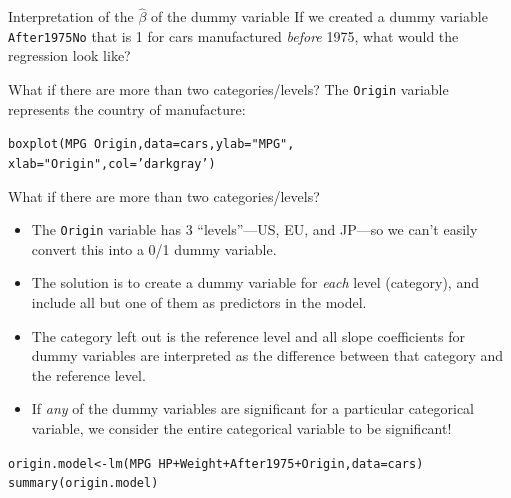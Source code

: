\documentclass{beamer}\usepackage[]{graphicx}\usepackage[]{color}
\makeatletter
\newcommand{\hlstr}[1]{\textcolor[rgb]{1,0.894,0.71}{#1}}%
\newcommand{\hlopt}[1]{\textcolor[rgb]{1,0.894,0.769}{#1}}%
\newcommand{\hlstd}[1]{\textcolor[rgb]{1,0.894,0.769}{#1}}%
\newcommand{\hlkwb}[1]{\textcolor[rgb]{0.804,0.776,0.451}{#1}}%
\newcommand{\hlkwc}[1]{\textcolor[rgb]{0.78,0.941,0.545}{#1}}%
\newcommand{\hlkwd}[1]{\textcolor[rgb]{1,0.78,0.769}{#1}}%
\newenvironment{kframe}{%
 \def\at@end@of@kframe{}%
 \ifinner\ifhmode%
  \def\at@end@of@kframe{\end{minipage}}%
  \begin{minipage}{\columnwidth}%
 \fi\fi%
 \def\FrameCommand##1{\hskip\@totalleftmargin \hskip-\fboxsep
 \colorbox{shadecolor}{##1}\hskip-\fboxsep
     \hskip-\linewidth \hskip-\@totalleftmargin \hskip\columnwidth}%
 \MakeFramed {\advance\hsize-\width
   \@totalleftmargin\z@ \linewidth\hsize
   \@setminipage}}%
 {\par\unskip\endMakeFramed%
 \at@end@of@kframe}
\newenvironment{knitrout}{}{} %
\makeatother
\begin{document}
\begin{darkframes}
\begin{frame}[fragile]{Interpretation of the $\hat\beta$ of the dummy variable}
      If we created a dummy variable \texttt{After1975No} that is 1 for cars manufactured \emph{before} 1975, what would the regression look like?
    \end{frame}

    \begin{frame}[fragile]{What if there are more than two categories/levels?}
      The \texttt{Origin} variable represents the country of manufacture:
\begin{knitrout}
\begin{kframe}
\begin{alltt}
\hlkwd{boxplot}\hlstd{(MPG} \hlopt{~} \hlstd{Origin,} \hlkwc{data}\hlstd{=cars,} \hlkwc{ylab}\hlstd{=}\hlstr{"MPG"}\hlstd{,}
              \hlkwc{xlab}\hlstd{=}\hlstr{"Origin"}\hlstd{,} \hlkwc{col}\hlstd{=}\hlstr{'darkgray'}\hlstd{)}
\end{alltt}
\end{kframe}


\end{knitrout}
    \end{frame}

    \begin{frame}[fragile]{What if there are more than two categories/levels?}
      \begin{itemize}[<+->]
        \item The \texttt{Origin} variable has 3 ``levels''---US, EU, and JP---so we can't easily convert this into a 0/1 dummy variable.
        \item The solution is to create a dummy variable for \emph{each} level (category), and include \alert{all but one} of them as predictors in the model.
        \item The category left out is the \alert{reference level} and all slope coefficients for dummy variables are interpreted as the difference between that category and the reference level.
        \item If \emph{any} of the dummy variables are significant for a particular categorical variable, we consider the entire categorical variable to be significant!
      \end{itemize}
    \end{frame}

    \begin{frame}[fragile]
      \fontsm\vspace{-0.15in}
\begin{knitrout}
\begin{kframe}
\begin{alltt}
\hlstd{origin.model} \hlkwb{<-} \hlkwd{lm}\hlstd{(MPG} \hlopt{~} \hlstd{HP} \hlopt{+} \hlstd{Weight} \hlopt{+} \hlstd{After1975} \hlopt{+} \hlstd{Origin,} \hlkwc{data}\hlstd{=cars)}
\hlkwd{summary}\hlstd{(origin.model)}
\end{alltt}
\begin{verbatim}


\end{verbatim}
\end{kframe}
\end{knitrout}
\end{frame}
\end{darkframes}
\end{document}
